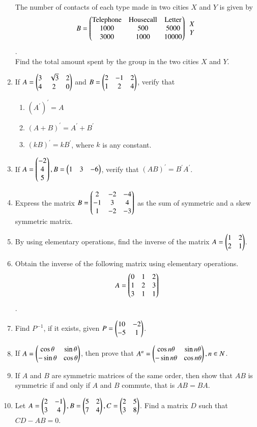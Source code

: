 \documentclass{article}
\theoremstyle{remark}
\begin{document}
\begin{enumerate}
\\ The number of contacts of each type made in two cities $X$ and $Y$ is given by 
\begin{align} B=\begin{pmatrix}\text{Telephone}&\text{Housecall}&\text{Letter} \\ 1000&500&5000\\3000&1000&10000\end{pmatrix}\begin {array}{c} X\\Y\end{array}\end{align}. 
\\ Find the total amount spent by the group in the two cities $X$ and $Y$.
\item If $A=\begin{pmatrix}3&\sqrt3&2\\4&2&0\end{pmatrix}$ and $B=\begin{pmatrix}2&-1&2\\1&2&4\end{pmatrix}$, verify that 
\begin{enumerate}
\item $(A^{\prime})^{\prime}=A$
\item $(A+B)^{\prime}=A^{\prime}+B^{\prime}$
\item $(kB)^{\prime}=kB^{\prime}$, where $k$ is any constant.
\end{enumerate}
\item If $A=\begin{pmatrix}-2\\4\\5\end{pmatrix}, B=\begin{pmatrix}1&3&-6\end{pmatrix}$, verify that $(AB)^{\prime}=B^{\prime}A^{\prime}$.
\item Express the matrix $B=\begin{pmatrix}2&-2&-4\\-1&3&4\\1&-2&-3\end{pmatrix}$ as the sum of symmetric and a skew symmetric matrix.
\item By using elementary operations, find the inverse of the matrix $A=\begin{pmatrix}1&2\\2&1\end{pmatrix}$.
\item Obtain the inverse of the following matrix using elementary operations. 
\begin{align}A=\begin{pmatrix}0&1&2\\1&2&3\\3&1&1\end{pmatrix} \end{align}.
\item Find $P^{-1}$, if it exists, given $P=\begin{pmatrix}10&-2\\-5&1\end{pmatrix}$.
\item If $A=\begin{pmatrix}\cos \theta& \sin \theta\\ -\sin \theta&\cos\theta\end{pmatrix}$, then prove that $A^n=\begin{pmatrix}\cos n\theta&\sin n\theta\\ -\sin n\theta&\cos n\theta\end{pmatrix}, n\in N$.
\item If $A$ and $B$ are symmetric matrices of the same order, then show that $AB$ is symmetric if and only if $A$ and $B$ commute, that is $AB=BA$.
\item Let $A=\begin{pmatrix}2&-1\\3&4\end{pmatrix}, B=\begin{pmatrix}5&2\\7&4\end{pmatrix}, C=\begin{pmatrix}2&5\\3&8\end{pmatrix}$. Find a matrix $D$ such that $CD-AB=0$.
\end{enumerate}
\end{document}
